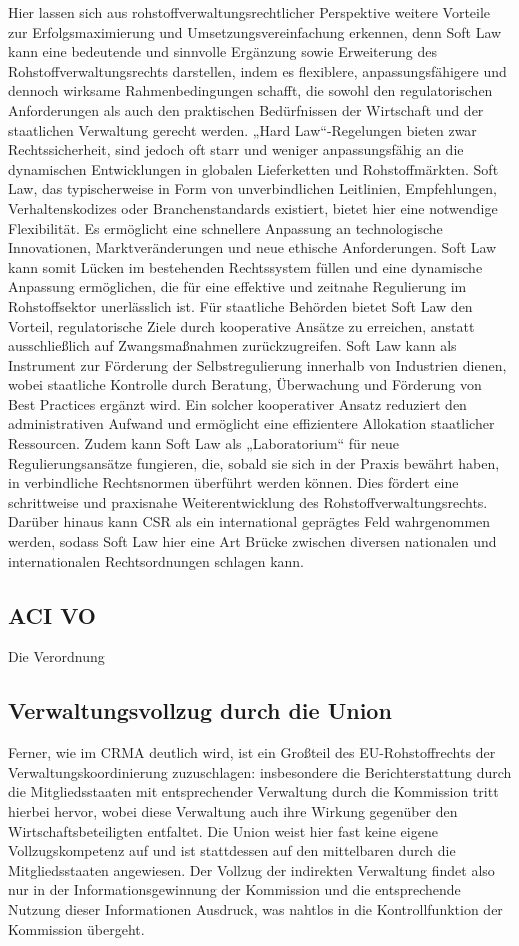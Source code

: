 \documentclass[12pt,a4paper,oneside]{book} %
\begin{document}
	Hier lassen sich aus rohstoffverwaltungsrechtlicher Perspektive weitere Vorteile zur Erfolgsmaximierung und Umsetzungsvereinfachung erkennen, denn Soft Law kann eine bedeutende und sinnvolle Ergänzung sowie Erweiterung des Rohstoffverwaltungsrechts darstellen, indem es flexiblere, anpassungsfähigere und dennoch wirksame Rahmenbedingungen schafft, die sowohl den regulatorischen Anforderungen als auch den praktischen Bedürfnissen der Wirtschaft und der staatlichen Verwaltung gerecht werden. „Hard Law“-Regelungen bieten zwar Rechtssicherheit, sind jedoch oft starr und weniger anpassungsfähig an die dynamischen Entwicklungen in globalen Lieferketten und Rohstoffmärkten. Soft Law, das typischerweise in Form von unverbindlichen Leitlinien, Empfehlungen, Verhaltenskodizes oder Branchenstandards existiert, bietet hier eine notwendige Flexibilität. Es ermöglicht eine schnellere Anpassung an technologische Innovationen, Marktveränderungen und neue ethische Anforderungen. Soft Law kann somit Lücken im bestehenden Rechtssystem füllen und eine dynamische Anpassung ermöglichen, die für eine effektive und zeitnahe Regulierung im Rohstoffsektor unerlässlich ist. Für staatliche Behörden bietet Soft Law den Vorteil, regulatorische Ziele durch kooperative Ansätze zu erreichen, anstatt ausschließlich auf Zwangsmaßnahmen zurückzugreifen. Soft Law kann als Instrument zur Förderung der Selbstregulierung innerhalb von Industrien dienen, wobei staatliche Kontrolle durch Beratung, Überwachung und Förderung von Best Practices ergänzt wird. Ein solcher kooperativer Ansatz reduziert den administrativen Aufwand und ermöglicht eine effizientere Allokation staatlicher Ressourcen. Zudem kann Soft Law als „Laboratorium“ für neue Regulierungsansätze fungieren, die, sobald sie sich in der Praxis bewährt haben, in verbindliche Rechtsnormen überführt werden können. Dies fördert eine schrittweise und praxisnahe Weiterentwicklung des Rohstoffverwaltungsrechts. Darüber hinaus kann CSR als ein international geprägtes Feld wahrgenommen werden, sodass Soft Law hier eine Art Brücke zwischen diversen nationalen und internationalen Rechtsordnungen schlagen kann.
	
	
	\subsection{ACI VO}
	Die Verordnung 
	
	
	\subsection{Verwaltungsvollzug durch die Union}
	Ferner, wie im CRMA deutlich wird, ist ein Großteil des EU-Rohstoffrechts der Verwaltungskoordinierung zuzuschlagen: insbesondere die Berichterstattung durch die Mitgliedsstaaten mit entsprechender Verwaltung durch die Kommission tritt hierbei hervor, wobei diese Verwaltung auch ihre Wirkung gegenüber den Wirtschaftsbeteiligten entfaltet. Die Union weist hier fast keine eigene Vollzugskompetenz auf und ist stattdessen auf den mittelbaren durch die Mitgliedsstaaten angewiesen. Der Vollzug der indirekten Verwaltung findet also nur in der Informationsgewinnung der Kommission und die entsprechende Nutzung dieser Informationen Ausdruck, was nahtlos in die Kontrollfunktion der Kommission übergeht.
	
\end{document}
